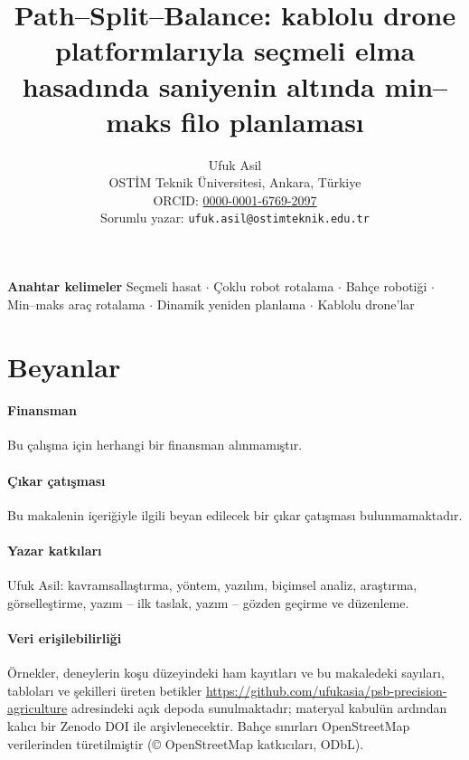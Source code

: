 \documentclass[11pt,a4paper]{article}
\title{Path--Split--Balance: kablolu drone platformlarıyla seçmeli elma hasadında
saniyenin altında min--maks filo planlaması}
\author{Ufuk Asil\\[2pt]
\small OST\.{I}M Teknik Üniversitesi, Ankara, Türkiye\\
\small ORCID: \href{https://orcid.org/0000-0001-6769-2097}{0000-0001-6769-2097}\\
\small Sorumlu yazar: \texttt{ufuk.asil@ostimteknik.edu.tr}}
\date{}
\begin{document}
\maketitle

\begin{abstract}
\noindent
\end{abstract}

\noindent\textbf{Anahtar kelimeler} Seçmeli hasat $\cdot$ Çoklu robot rotalama $\cdot$
Bahçe robotiği $\cdot$ Min--maks araç rotalama $\cdot$ Dinamik yeniden planlama $\cdot$
Kablolu drone'lar











\section{Beyanlar}
\paragraph{Finansman} Bu çalışma için herhangi bir finansman alınmamıştır.

\paragraph{Çıkar çatışması} Bu makalenin içeriğiyle ilgili beyan edilecek
bir çıkar çatışması bulunmamaktadır.

\paragraph{Yazar katkıları} Ufuk Asil: kavramsallaştırma, yöntem, yazılım, biçimsel
analiz, araştırma, görselleştirme, yazım -- ilk taslak, yazım -- gözden geçirme ve
düzenleme.

\paragraph{Veri erişilebilirliği} Örnekler, deneylerin koşu düzeyindeki ham
kayıtları ve bu makaledeki sayıları, tabloları ve şekilleri üreten betikler
\url{https://github.com/ufukasia/psb-precision-agriculture} adresindeki açık depoda
sunulmaktadır; materyal kabulün ardından kalıcı bir Zenodo DOI ile arşivlenecektir.
Bahçe sınırları OpenStreetMap verilerinden türetilmiştir (\copyright{} OpenStreetMap
katkıcıları, ODbL).
\end{document}
